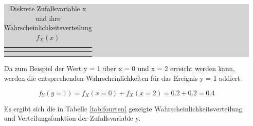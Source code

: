 \begin{table}[H]
\caption{Diskrete Zufallsvariable x und ihre Wahrscheinlichkeitsverteilung $f_{X}(x)$}
\setlength{\fboxsep}{0pt}%
\colorbox{lightgray}{%
%
\begin{tabular}{| c | c | c | c | c | c |}
\hline

\parbox[c][0.28in][c]{0.97in}{\smallskip\centering\textbf{}} &
\parbox[c][0.28in][c]{0.97in}{} &
\parbox[c][0.28in][c]{0.97in}{} &
\parbox[c][0.28in][c]{0.97in}{} &
\parbox[c][0.28in][c]{0.97in}{} &
\parbox[c][0.28in][c]{0.97in}{} \\ \hline

\parbox[c][0.28in][c]{0.97in}{\smallskip\centering\textbf{}} &
\parbox[c][0.28in][c]{0.97in}{} &
\parbox[c][0.28in][c]{0.97in}{} &
\parbox[c][0.28in][c]{0.97in}{} &
\parbox[c][0.28in][c]{0.97in}{} &
\parbox[c][0.28in][c]{0.97in}{} \\ \hline

\parbox[c][0.28in][c]{0.97in}{\smallskip\centering\textbf{}} &
\parbox[c][0.28in][c]{0.97in}{} &
\parbox[c][0.28in][c]{0.97in}{} &
\parbox[c][0.28in][c]{0.97in}{} &
\parbox[c][0.28in][c]{0.97in}{} &
\parbox[c][0.28in][c]{0.97in}{} \\ \hline

\end{tabular}%
}\bigskip
\label{tab:fournine}
\end{table}

\noindent Da zum Beispiel der Wert y = 1 \"{u}ber x = 0 und x = 2 erreicht werden kann, werden die entsprechenden Wahrscheinlichkeiten f\"{u}r das Ereignis y = 1 addiert.

\begin{equation}\label{eq:foureightyone}
f_{Y} (y=1)=f_{X}(x=0)+f_{X} (x=2)=0.2+0.2=0.4
\end{equation}

\noindent Es ergibt sich die in Tabelle \ref{tab:fourten} gezeigte Wahrscheinlichkeitsverteilung und Verteilungsfunktion der Zufallsvariable y.

